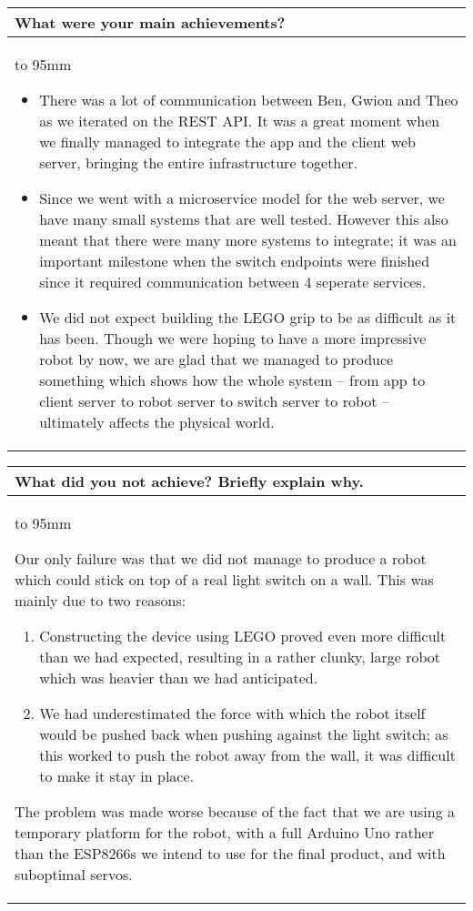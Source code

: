 \documentclass[a4paper]{article}
\newcommand{\colWidth}{141mm}
\begin{document}
\begin{center}
\begin{tabular}{|p{\colWidth}|}
	\hline
	\cellcolor{blue!25}\large
	\textbf{What were your main achievements?}
	\\ \hline
	\vtop to 95mm{
		\begin{itemize}
			\item There was a lot of communication between Ben, Gwion and Theo as we iterated on the REST API. It was a great moment when we finally managed to integrate the app and the client web server, bringing the entire infrastructure together.
			\item Since we went with a microservice model for the web server, we have many small systems that are well tested. However this also meant that there were many more systems to integrate; it was an important milestone when the switch endpoints were finished since it required communication between 4 seperate services.
			\item We did not expect building the LEGO grip to be as difficult as it has been. Though we were hoping to have a more impressive robot by now, we are glad that we managed to produce something which shows how the whole system -- from app to client server to robot server to switch server to robot -- ultimately affects the physical world.
		\end{itemize}
	}
  \\
  \hline
\end{tabular}
\vskip 5mm


\begin{tabular}{|p{\colWidth}|}
	\hline
	\cellcolor{blue!25}\large
	\textbf{What did you not achieve? Briefly explain why.}
	\\ \hline
	\vtop to 95mm{
		Our only failure was that we did not manage to produce a robot which could stick on top of a real light switch on a wall.
		This was mainly due to two reasons:
		\begin{enumerate}
			\item Constructing the device using LEGO proved even more difficult than we had expected, resulting in a rather clunky, large robot which was heavier than we had anticipated.
			\item We had underestimated the force with which the robot itself would be pushed back when pushing against the light switch; as this worked to push the robot away from the wall, it was difficult to make it stay in place. 
		\end{enumerate}
		The problem was made worse because of the fact that we are using a temporary platform for the robot, with a full Arduino Uno rather than the ESP8266s we intend to use for the final product, and with suboptimal servos.

}
\end{tabular}
\end{center}
\end{document}
